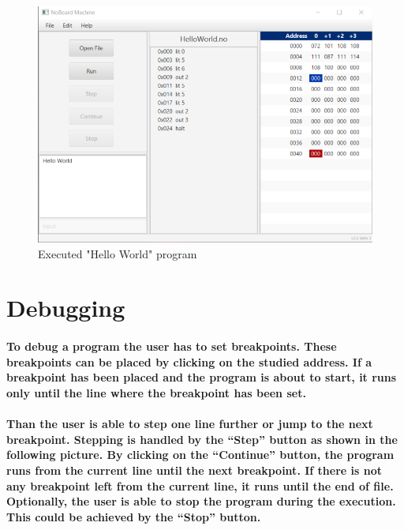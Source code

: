 \begin{figure}[h] 
	\centering
	\includegraphics[scale=.75]{images/screenshot-1.png}
	\caption{Executed "Hello World" program}
\end{figure}

\section{Debugging}
\paragraph{To debug a program the user has to set breakpoints. These breakpoints can be placed by clicking on the studied address. If a breakpoint has been placed and the program is about to start, it runs only until the line where the breakpoint has been set.}

\paragraph{Than the user is able to step one line further or jump to the next breakpoint. Stepping is handled by the “Step” button as shown in the following picture. By clicking on the “Continue” button, the program runs from the current line until the next breakpoint. If there is not any breakpoint left from the current line, it runs until the end of file. Optionally, the user is able to stop the program during the execution. This could be achieved by the “Stop” button.}

